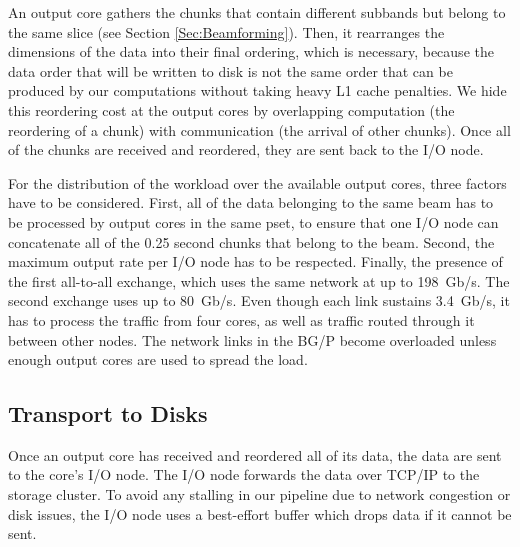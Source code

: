 \documentclass{llncs}
\begin{document}
An output core gathers the chunks that contain different subbands but belong to the same slice (see Section \ref{Sec:Beamforming}). Then, it rearranges the dimensions of the data into their final ordering, which is necessary, because the data order that will be written to disk is not the same order that can be produced by our computations without taking heavy L1 cache penalties. We hide this reordering cost at the output cores by overlapping computation (the reordering of a chunk) with communication (the arrival of other chunks). Once all of the chunks are received and reordered, they are sent back to the I/O node.

For the distribution of the workload over the available output cores, three factors have to be considered. First, all of the data belonging to the same beam has to be processed by output cores in the same pset, to ensure that one I/O node can concatenate all of the 0.25 second chunks that belong to the beam. Second, the maximum output rate per I/O node has to be respected. Finally, the presence of the first all-to-all exchange, which uses the same network at up to 198~Gb/s. The second exchange uses up to 80~Gb/s. Even though each link sustains 3.4~Gb/s, it has to process the traffic from four cores, as well as traffic routed through it between other nodes. The network links in the BG/P become overloaded unless enough output cores are used to spread the load.

\subsection{Transport to Disks}
Once an output core has received and reordered all of its data, the data are sent to the core's I/O node. The I/O node forwards the data over TCP/IP to the storage cluster. To avoid any stalling in our pipeline due to network congestion or disk issues, the I/O node uses a best-effort buffer which drops data if it cannot be sent.

\end{document}

